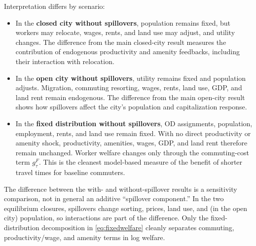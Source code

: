 \documentclass[11pt,a4paper]{article}
\begin{document}
Interpretation differs by scenario:
\begin{itemize}
\item In the \textbf{closed city without spillovers}, population remains fixed,
but workers may relocate, wages, rents, and land use may adjust, and utility
changes. The difference from the main closed-city result measures the
contribution of endogenous productivity and amenity feedbacks, including their
interaction with relocation.
\item In the \textbf{open city without spillovers}, utility remains fixed and
population adjusts. Migration, commuting resorting, wages, rents, land use,
GDP, and land rent remain endogenous. The difference from the main open-city
result shows how spillovers affect the city's population and capitalization
response.
\item In the \textbf{fixed distribution without spillovers}, OD assignments,
population, employment, rents, and land use remain fixed. With no direct
productivity or amenity shock, productivity, amenities, wages, GDP, and land
rent therefore remain unchanged. Worker welfare changes only through the
commuting-cost term $g_\tau^F$. This is the cleanest model-based measure of the
benefit of shorter travel times for baseline commuters.
\end{itemize}

The difference between the with- and without-spillover results is a sensitivity
comparison, not in general an additive ``spillover component.'' In the two
equilibrium closures, spillovers change sorting, prices, land use, and (in the
open city) population, so interactions are part of the difference. Only the
fixed-distribution decomposition in \eqref{eq:fixedwelfare} cleanly separates
commuting, productivity/wage, and amenity terms in log welfare.
\end{document}
